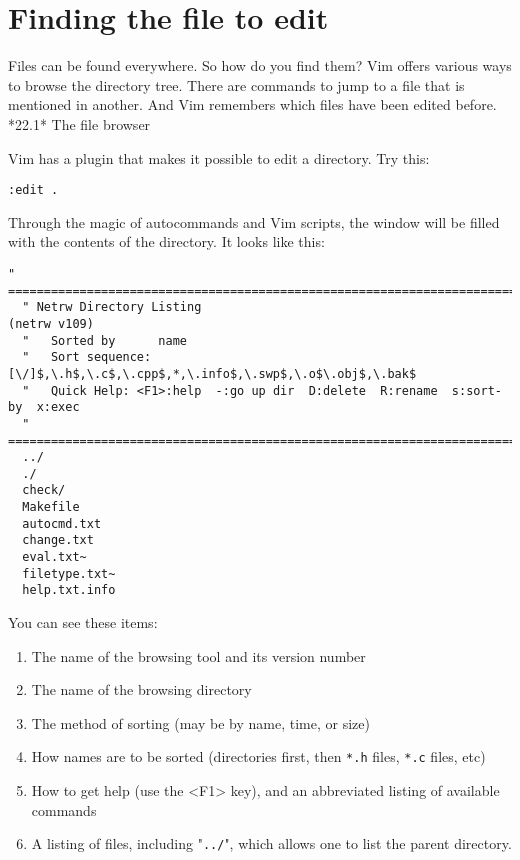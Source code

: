 \section{Finding the file to edit}
Files can be found everywhere.  So how do you find them?  Vim offers various
ways to browse the directory tree.  There are commands to jump to a file that
is mentioned in another.  And Vim remembers which files have been edited
before.
*22.1*    The file browser

Vim has a plugin that makes it possible to edit a directory.  Try this:

\begin{Verbatim}[samepage=true]
 :edit .
\end{Verbatim}

Through the magic of autocommands and Vim scripts, the window will be filled with the contents of the directory.
It looks like this:

\begin{Verbatim}[samepage=true]
  " ============================================================================ 
  " Netrw Directory Listing                                        (netrw v109) 
  "   Sorted by      name 
  "   Sort sequence: [\/]$,\.h$,\.c$,\.cpp$,*,\.info$,\.swp$,\.o$\.obj$,\.bak$ 
  "   Quick Help: <F1>:help  -:go up dir  D:delete  R:rename  s:sort-by  x:exec 
  " ============================================================================ 
  ../ 
  ./ 
  check/ 
  Makefile 
  autocmd.txt 
  change.txt 
  eval.txt~ 
  filetype.txt~ 
  help.txt.info 
\end{Verbatim}

You can see these items:

\begin{enumerate}
\item The name of the browsing tool and its version number
\item The name of the browsing directory
\item The method of sorting (may be by name, time, or size)
\item How names are to be sorted (directories first, then \verb!*.h! files, \verb!*.c! files, etc)
\item How to get help (use the <F1> key), and an abbreviated listing of available commands
\item A listing of files, including "\verb!../!", which allows one to list the parent directory.
\end{enumerate}

